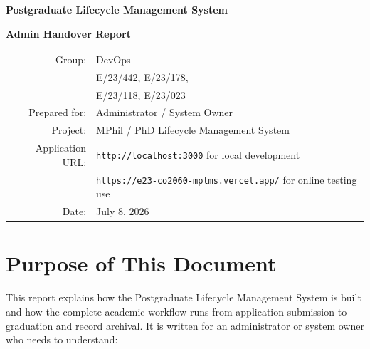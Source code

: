 \documentclass[11pt,a4paper]{article}
\newcommand{\code}[1]{\texttt{#1}}
\begin{document}

\begin{titlepage}
  \centering
  \vspace*{4.5cm}
  {\Huge\bfseries Postgraduate Lifecycle Management System\par}
  \vspace{1cm}
  {\Large\bfseries Admin Handover Report\par}
  \vspace{1cm}
  \vfill
  \begin{tabular}{rl}
    Group: & DevOps\\
    &   E/23/442, E/23/178,\\
    &   E/23/118, E/23/023\\
    Prepared for: & Administrator / System Owner \\
    Project: & MPhil / PhD Lifecycle Management System \\
    Application URL: & \code{http://localhost:3000} for local development \\
     & \code{https://e23-co2060-mplms.vercel.app/} for online testing use\\
    Date: & July 8, 2026 \\
  \end{tabular}
  \vfill
\end{titlepage}

\setcounter{page}{1}
\tableofcontents
\newpage
{}

\section{Purpose of This Document}

This report explains how the Postgraduate Lifecycle Management System is built and how the complete academic workflow runs from application submission to graduation and record archival. It is written for an administrator or system owner who needs to understand:
\end{document}
